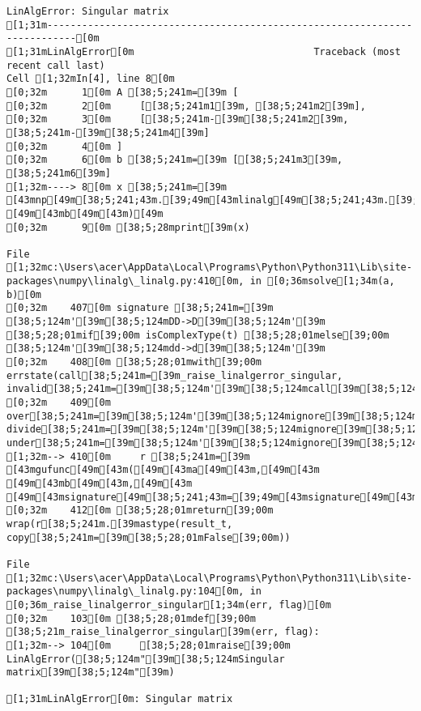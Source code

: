\documentclass[
  letterpaper,
  DIV=11,
  numbers=noendperiod]{scrartcl}
\begin{document}
\begin{verbatim}
LinAlgError: Singular matrix
[1;31m---------------------------------------------------------------------------[0m
[1;31mLinAlgError[0m                               Traceback (most recent call last)
Cell [1;32mIn[4], line 8[0m
[0;32m      1[0m A [38;5;241m=[39m [
[0;32m      2[0m     [[38;5;241m1[39m, [38;5;241m2[39m],
[0;32m      3[0m     [[38;5;241m-[39m[38;5;241m2[39m, [38;5;241m-[39m[38;5;241m4[39m]
[0;32m      4[0m ]
[0;32m      6[0m b [38;5;241m=[39m [[38;5;241m3[39m, [38;5;241m6[39m]
[1;32m----> 8[0m x [38;5;241m=[39m [43mnp[49m[38;5;241;43m.[39;49m[43mlinalg[49m[38;5;241;43m.[39;49m[43msolve[49m[43m([49m[43mA[49m[43m,[49m[43m [49m[43mb[49m[43m)[49m
[0;32m      9[0m [38;5;28mprint[39m(x)

File [1;32mc:\Users\acer\AppData\Local\Programs\Python\Python311\Lib\site-packages\numpy\linalg\_linalg.py:410[0m, in [0;36msolve[1;34m(a, b)[0m
[0;32m    407[0m signature [38;5;241m=[39m [38;5;124m'[39m[38;5;124mDD->D[39m[38;5;124m'[39m [38;5;28;01mif[39;00m isComplexType(t) [38;5;28;01melse[39;00m [38;5;124m'[39m[38;5;124mdd->d[39m[38;5;124m'[39m
[0;32m    408[0m [38;5;28;01mwith[39;00m errstate(call[38;5;241m=[39m_raise_linalgerror_singular, invalid[38;5;241m=[39m[38;5;124m'[39m[38;5;124mcall[39m[38;5;124m'[39m,
[0;32m    409[0m               over[38;5;241m=[39m[38;5;124m'[39m[38;5;124mignore[39m[38;5;124m'[39m, divide[38;5;241m=[39m[38;5;124m'[39m[38;5;124mignore[39m[38;5;124m'[39m, under[38;5;241m=[39m[38;5;124m'[39m[38;5;124mignore[39m[38;5;124m'[39m):
[1;32m--> 410[0m     r [38;5;241m=[39m [43mgufunc[49m[43m([49m[43ma[49m[43m,[49m[43m [49m[43mb[49m[43m,[49m[43m [49m[43msignature[49m[38;5;241;43m=[39;49m[43msignature[49m[43m)[49m
[0;32m    412[0m [38;5;28;01mreturn[39;00m wrap(r[38;5;241m.[39mastype(result_t, copy[38;5;241m=[39m[38;5;28;01mFalse[39;00m))

File [1;32mc:\Users\acer\AppData\Local\Programs\Python\Python311\Lib\site-packages\numpy\linalg\_linalg.py:104[0m, in [0;36m_raise_linalgerror_singular[1;34m(err, flag)[0m
[0;32m    103[0m [38;5;28;01mdef[39;00m [38;5;21m_raise_linalgerror_singular[39m(err, flag):
[1;32m--> 104[0m     [38;5;28;01mraise[39;00m LinAlgError([38;5;124m"[39m[38;5;124mSingular matrix[39m[38;5;124m"[39m)

[1;31mLinAlgError[0m: Singular matrix
\end{verbatim}
\end{document}
